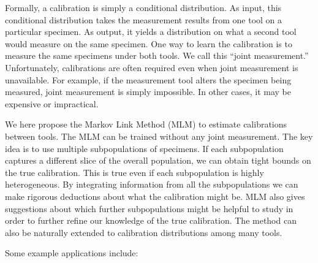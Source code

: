 Formally, a calibration is simply a conditional distribution.  As input, this conditional distribution takes the measurement results from one tool on a particular specimen.  As output, it yields a distribution on what a second tool would measure on the same specimen.  One way to learn the calibration is to measure the same specimens under both tools.
We call this ``joint measurement.''  Unfortunately, calibrations are often required even when joint measurement is unavailable.  For example, if the measurement tool alters the specimen being measured, joint measurement is simply impossible.  In other cases, it may be expensive or impractical.

We here propose the Markov Link Method (MLM) to estimate calibrations between tools.  The MLM can be trained without any joint measurement.  The key idea is to use multiple subpopulations of specimens.  If each subpopulation captures a different slice of the overall population, we can obtain tight bounds on the true calibration.  This is true even if each subpopulation is highly heterogeneous.  By integrating information from all the subpopulations we can make rigorous deductions about what the calibration might be.  MLM also gives suggestions about which further subpopulations might be helpful to study in order to further refine our knowledge of the true calibration.  The method can also be naturally extended to calibration distributions among many tools.

Some example applications include:

